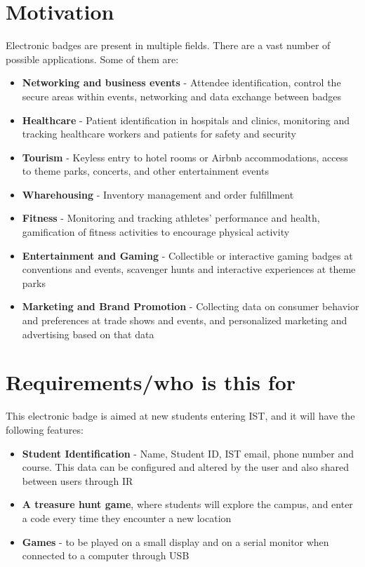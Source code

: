 \documentclass[english]{ist-thesis}
\begin{document}
\section{Motivation}

Electronic badges are present in multiple fields. There are a vast number of possible applications. Some of them are:

\begin{itemize}
    \item \textbf{Networking and business events} - Attendee identification, control the secure areas within events, networking and data exchange between badges 
    \item \textbf{Healthcare} - Patient identification in hospitals and clinics, monitoring and tracking healthcare workers and patients for safety and security
    \item \textbf{Tourism} - Keyless entry to hotel rooms or Airbnb accommodations, access to theme parks, concerts, and other entertainment events
    \item \textbf{Wharehousing} - Inventory management and order fulfillment
    \item \textbf{Fitness} - Monitoring and tracking athletes' performance and health, gamification of fitness activities to encourage physical activity
    \item \textbf{Entertainment and Gaming} - Collectible or interactive gaming badges at conventions and events, scavenger hunts and interactive experiences at theme parks
    \item \textbf{Marketing and Brand Promotion} - Collecting data on consumer behavior and preferences at trade shows and events, and personalized marketing and advertising based on that data
\end{itemize}

\section{Requirements/who is this for}

This electronic badge is aimed at new students entering IST, and it will have the following features:

\begin{itemize}
    \item \textbf{Student Identification} - Name, Student ID, IST email, phone number and course. This data can be configured and altered by the user and also shared between users through IR
    \item \textbf{A treasure hunt game}, where students will explore the campus, and enter a code every time they encounter a new location
    \item \textbf{Games} - to be played on a small display and on a serial monitor when connected to a computer through USB
\end{itemize}
\end{document}
